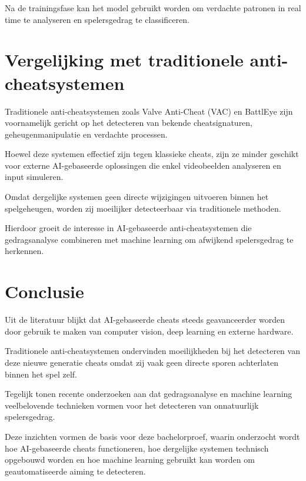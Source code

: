 Na de trainingsfase kan het model gebruikt worden om verdachte patronen in real time te analyseren en spelersgedrag te classificeren.

\section{Vergelijking met traditionele anti-cheatsystemen}

Traditionele anti-cheatsystemen zoals Valve Anti-Cheat (VAC) en BattlEye zijn voornamelijk gericht op het detecteren van bekende cheatsignaturen, geheugenmanipulatie en verdachte processen.

Hoewel deze systemen effectief zijn tegen klassieke cheats, zijn ze minder geschikt voor externe AI-gebaseerde oplossingen die enkel videobeelden analyseren en input simuleren.

Omdat dergelijke systemen geen directe wijzigingen uitvoeren binnen het spelgeheugen, worden zij moeilijker detecteerbaar via traditionele methoden.

Hierdoor groeit de interesse in AI-gebaseerde anti-cheatsystemen die gedragsanalyse combineren met machine learning om afwijkend spelersgedrag te herkennen.

\section{Conclusie}

Uit de literatuur blijkt dat AI-gebaseerde cheats steeds geavanceerder worden door gebruik te maken van computer vision, deep learning en externe hardware.

Traditionele anti-cheatsystemen ondervinden moeilijkheden bij het detecteren van deze nieuwe generatie cheats omdat zij vaak geen directe sporen achterlaten binnen het spel zelf.

Tegelijk tonen recente onderzoeken aan dat gedragsanalyse en machine learning veelbelovende technieken vormen voor het detecteren van onnatuurlijk spelersgedrag.

Deze inzichten vormen de basis voor deze bachelorproef, waarin onderzocht wordt hoe AI-gebaseerde cheats functioneren, hoe dergelijke systemen technisch opgebouwd worden en hoe machine learning gebruikt kan worden om geautomatiseerde aiming te detecteren.